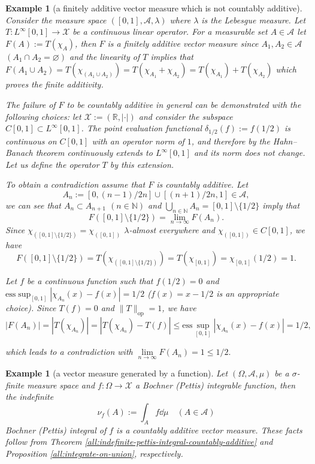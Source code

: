 \documentclass[a4paper, 12pt]{article}
\newtheorem{example}[lem]{Example}
\begin{document}
\begin{example}[a finitely additive vector measure which is not countably additive]\label{all:finitely-additive-but-not-countably-additive-vecmeasure} \normalfont Consider the measure space $([0,1], \mathcal{A}, \lambda)$ where $\lambda$ is the Lebesgue measure. Let $T\colon L^{\infty}[0,1] \to \mathcal{X}$ be a continuous linear operator. For a measurable set $A \in \mathcal{A}$ let $F(A) := T(\chi_A)$, then $F$ is a finitely additive vector measure since $A_1, A_2 \in \mathcal{A}$ $(A_1 \cap A_2 = \varnothing)$ and the linearity of $T$ implies that $F(A_1 \cup A_2) = T(\chi_{(A_1 \cup A_2)}) = T(\chi_{A_1} + \chi_{A_2}) = T(\chi_{A_1}) + T(\chi_{A_2})$ which proves the finite additivity.

The failure of $F$ to be countably additive in general can be demonstrated with the following choices: let $\mathcal{X} := (\mathbb{R}, | \cdot |)$ and consider the subspace $C[0,1] \subset L^\infty[0,1]$. The point evaluation functional $\delta_{1/2}(f) := f(1/2)$ is continuous on $C[0,1]$ with an operator norm of $1$, and therefore by the Hahn\---Banach theorem continuously extends to $L^\infty[0,1]$ and its norm does not change. Let us define the operator $T$ by this extension.

To obtain a contradiction assume that $F$ is countably additive. Let
$$A_n := [0, (n-1)/2n] \cup [(n+1)/2n, 1] \in \mathcal{A},$$
we can see that $A_n \subset A_{n+1}$ $(n \in \mathbb{N})$ and $\bigcup\limits_{n \in \mathbb{N}} A_n = [0,1] \setminus \lbrace 1/2 \rbrace$ imply that
$$F([0,1] \setminus \lbrace 1/2 \rbrace) = \lim_{n \to \infty} F(A_n).$$
Since $\chi_{([0,1] \setminus \lbrace 1/2 \rbrace)} = \chi_{([0,1])}$ $\lambda$-almost everywhere and $\chi_{([0,1])} \in C[0,1]$, we have
$$F([0,1] \setminus \lbrace 1/2 \rbrace) = T(\chi_{([0,1] \setminus \lbrace 1/2 \rbrace)}) = T(\chi_{[0,1]}) = \chi_{[0,1]}(1/2)=1.$$

Let $f$ be a continuous function such that $f(1/2)=0$ and $\mathrm{ess} \sup_{[0,1]} | \chi_{A_n}(x) - f(x) | = 1/2$ ($f(x) = x - 1/2$ is an appropriate choice). Since $T(f) = 0$ and $\|T \|_{\mathrm{op}} = 1$, we have 
$$|F(A_n)| = |T(\chi_{A_n})| = |T(\chi_{A_n}) - T(f)| \leqslant \mathrm{ess} \sup_{[0,1]} | \chi_{A_n}(x) - f(x) | = 1/2,$$

which leads to a contradiction with $\lim\limits_{n \to \infty} F(A_n) = 1 \leqslant 1/2.$
\end{example}

\begin{example}[a vector measure generated by a function]\label{all:measure-generated-by-a-function} \normalfont Let $(\Omega, \mathcal{A}, \mu)$ be a $\sigma$-finite measure space and $f \colon \Omega \to \mathcal{X}$ a Bochner (Pettis) integrable function, then the indefinite
$$\nu_f(A) := \int_{A} f \dd{\mu} \quad (A \in \mathcal{A})$$
Bochner (Pettis) integral of $f$ is a countably additive vector measure. These facts follow from Theorem \ref{all:indefinite-pettis-integral-countably-additive} and Proposition \ref{all:integrate-on-union}, respectively.
\end{example}
\end{document}
